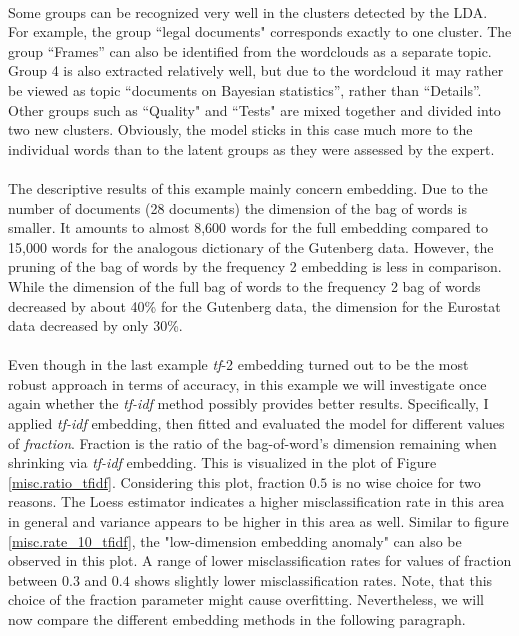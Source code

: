 \documentclass[11pt,a4paper]{article}
\begin{document}
\ \\
Some groups can be recognized very well in the clusters detected by the LDA. For example, the group ``legal documents" corresponds exactly to one cluster. The group “Frames” can also be identified from the wordclouds as a separate topic. Group 4 is also extracted relatively well, but due to the wordcloud it may rather be viewed as topic “documents on Bayesian statistics”, rather than “Details”. Other groups such as ``Quality" and ``Tests" are mixed together and divided into two new clusters. Obviously, the model sticks in this case much more to the individual words than to the latent groups as they were assessed by the expert.\\
\ \\
The descriptive results of this example mainly concern embedding. Due to the number of documents (28 documents) the dimension of the bag of words is smaller. It amounts to almost 8,600 words for the full embedding compared to 15,000 words for the analogous dictionary of the Gutenberg data. However, the pruning of the bag of words by the frequency 2 embedding is less in comparison. While the dimension of the full bag of words to the frequency 2 bag of words decreased by about 40\% for the Gutenberg data, the dimension for the Eurostat data decreased by only 30\%.\\
\ \\
Even though in the last example \textit{tf}-2 embedding turned out to be the most robust approach in terms of accuracy, in this example we will investigate once again whether the \textit{tf-idf} method possibly provides better results. Specifically, I applied \textit{tf-idf} embedding, then fitted and evaluated the model for different values of \textit{fraction}. Fraction is the ratio of the bag-of-word’s dimension remaining when shrinking via \textit{tf-idf} embedding. This is visualized in the plot of Figure \ref{misc.ratio_tfidf}. Considering this plot, fraction $0.5$ is no wise choice for two reasons. The Loess estimator indicates a higher misclassification rate in this area in general and variance appears to be higher in this area as well. Similar to figure \ref{misc.rate_10_tfidf}, the "low-dimension embedding anomaly" can also be observed in this plot. A range of lower misclassification rates for values of fraction between $0.3$ and $0.4$ shows slightly lower misclassification rates. Note, that this choice of the fraction parameter might cause overfitting. Nevertheless, we will now compare the different embedding methods in the following paragraph.\\
\end{document}
